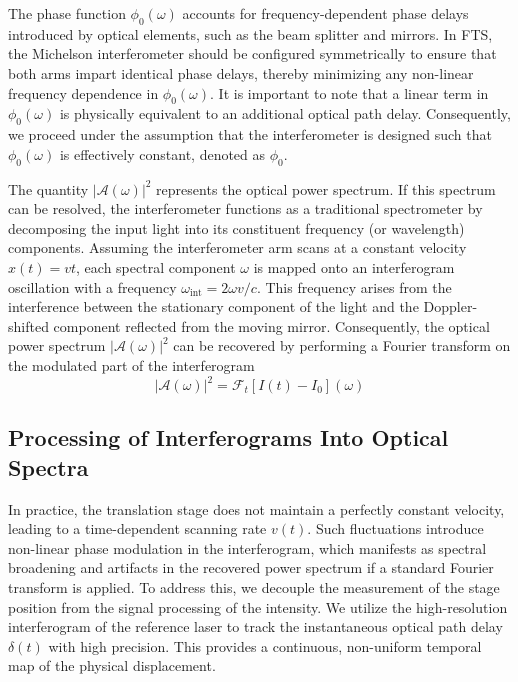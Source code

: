 \documentclass[12pt]{report}
\begin{document}
	The phase function $\phi_0(\omega)$ accounts for frequency-dependent phase delays introduced by optical elements, such as the beam splitter and mirrors. In FTS, the Michelson interferometer should be configured symmetrically to ensure that both arms impart identical phase delays, thereby minimizing any non-linear frequency dependence in $\phi_0(\omega)$. It is important to note that a linear term in $\phi_0(\omega)$ is physically equivalent to an additional optical path delay. Consequently, we proceed under the assumption that the interferometer is designed such that $\phi_0(\omega)$ is effectively constant, denoted as $\phi_0$.
	
	The quantity $|\mathcal{A}(\omega)|^2$ represents the optical power spectrum. If this spectrum can be resolved, the interferometer functions as a traditional spectrometer by decomposing the input light into its constituent frequency (or wavelength) components. Assuming the interferometer arm scans at a constant velocity $x(t) = vt$, each spectral component $\omega$ is mapped onto an interferogram oscillation with a frequency $\omega_\mathrm{int} = 2\omega v/c$. This frequency arises from the interference between the stationary component of the light and the Doppler-shifted component reflected from the moving mirror. Consequently, the optical power spectrum $|\mathcal{A}(\omega)|^2$ can be recovered by performing a Fourier transform on the modulated part of the interferogram
	\begin{equation}
		\left|\mathcal{A}(\omega)\right|^2 = \mathcal{F}_t\left[I(t) - I_0\right](\omega)
	\end{equation}
	
	\subsection{Processing of Interferograms Into Optical Spectra}
	
	In practice, the translation stage does not maintain a perfectly constant velocity, leading to a time-dependent scanning rate $v(t)$. Such fluctuations introduce non-linear phase modulation in the interferogram, which manifests as spectral broadening and artifacts in the recovered power spectrum if a standard Fourier transform is applied. To address this, we decouple the measurement of the stage position from the signal processing of the intensity. We utilize the high-resolution interferogram of the reference laser to track the instantaneous optical path delay $\delta(t)$ with high precision. This provides a continuous, non-uniform temporal map of the physical displacement.
	
\end{document}
